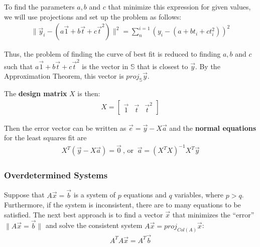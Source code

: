 \documentclass[a4paper,9pt]{extarticle}
\begin{document}
\begin{multicols*}{2}
To find the parameters $a, b$ and $c$ that minimize this expression for given values, we will use projections and set up the problem as follows:
\begin{equation} \label{7.3-2}
    \begin{split}
        \|\vec{y}_i - (a\vec{1} + b\vec{t} + c\vec{t}^2)\|^2 = \sum_{n}^{i = 1} (y_i - (a + bt_i + ct_i^2))^2
    \end{split}
\end{equation}

Thus, the problem of finding the curve of best fit is reduced to finding $a, b$ and $c$ such that $a\vec{1} + b\vec{t} + c\vec{t}^2$ is the vector in $\mathbb{S}$ that is closest to $\vec{y}$. By the Approximation Theorem, this vector is $proj_{\mathbb{S}} \vec{y}$.

The \textbf{design matrix} $X$ is then:
\begin{equation} \label{7.3-3}
    \begin{split}
        X = \begin{bmatrix}\vec{1} & \vec{t} & \vec{t}^2\end{bmatrix}
    \end{split}
\end{equation}

Then the error vector can be written as $\vec{e} = \vec{y} - X\vec{a}$ and the \textbf{normal equations} for the least squares fit are
\begin{equation} \label{7.3-4}
    \begin{split}
        X^T (\vec{y} - X\vec{a}) = \vec{0} \> \textrm{, or } \> \vec{a} = (X^T X)^{-1} X^T \vec{y}
    \end{split}
\end{equation}


\subsubsection{Overdetermined Systems}
Suppose that $A \vec{x} = \vec{b}$ is a system of $p$ equations and $q$ variables, where $p > q$. Furthermore, if the system is inconsistent, there are to many equations to be satisfied. The next best approach is to find a vector $\vec{x}$ that minimizes the ``error'' $\|A \vec{x} = \vec{b}\|$ and solve the consistent system $A \vec{x} = proj_{Col(A)} \vec{x}$:
\begin{equation} \label{7.3-5}
    \begin{split}
        A^T A \vec{x} = A^T \vec{b}
    \end{split}
\end{equation}


\end{multicols*}
\end{document}
